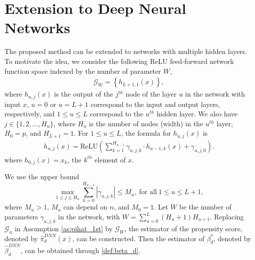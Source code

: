 \documentclass[11pt]{article}
\numberwithin{equation}{section}
\begin{document}

\section{Extension to Deep Neural Networks}\label{sec:deep}
The proposed method can be extended to networks with multiple hidden layers. To motivate the idea, we consider the following ReLU feed-forward network function space indexed by the number of parameter $W$,
\begin{align*}
	\mathcal{G}_{W}=\left\{h_{L+1,1}(x)\right\},
\end{align*}
where $h_{u,j}(x)$ is the output of the $j^{th}$ node of the layer $u$ in the network with input $x$, $u=0$
or $u=L+1$ correspond to the input and output layers, respectively, and $1 \leq u\leq L$ correspond
to the $u^{th}$ hidden layer. We also have $j\in\{1,2,...,H_u\}$, where $H_u$ is the number of nodes (width) in the $u^{th}$ layer, $H_0=p$, and $H_{L+1}=1$. For $1\leq u \leq L$, the formula for $h_{u,j}(x)$ is
\begin{align*}
	h_{u,j}(x)=\text{ReLU}\left(\sum_{k=1}^{H_{u-1}}\gamma_{u,j,k}\cdot h_{u-1,k}(x)+\gamma_{u,j,0}\right).
\end{align*}
where $h_{0,j}(x)=x_k$, the $k^{th}$ element of $x$.

We use the upper bound $$\max_{1\leq j\leq H_u}\sum_{k=0}^{H_{u-1}}|\gamma_{u,j,k}|\leq M_u,\ \text{for all}\ 1\leq u\leq L+1,$$ where $M_u>1$, $M_u$ can depend on $n$, and $M_0=1$. Let $W$ be the number of parameters $\gamma_{u,j,k}$ in the network, with $W=\sum_{u=0}^{L}(H_u+1)H_{u+1}$. Replacing $\mathcal{G}_{n}$ in Assumption \ref{as:pihat_1st} by $\mathcal{G}_{W}$,  the estimator of the propensity score, denoted by $\widehat{\pi}^{DNN}_d(x)$, can be constructed. Then the estimator of $\beta_d^*$, denoted by $\widehat{\beta}^{DNN}_d$, can be obtained through \eqref{def:beta_d}.
\end{document}
